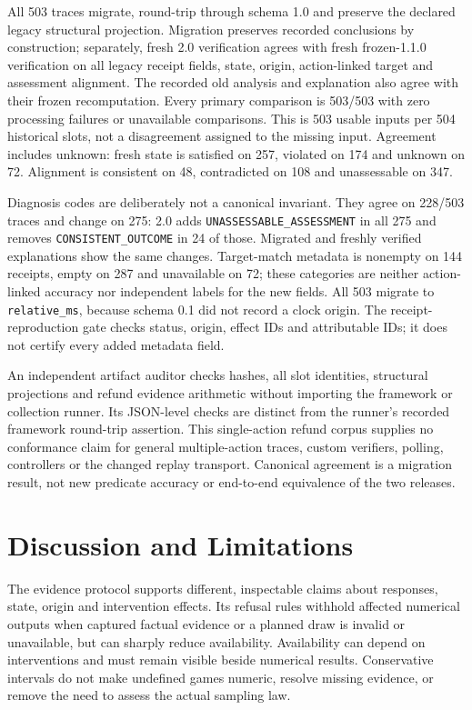 \documentclass[conference]{IEEEtran}
\begin{document}
All 503 traces migrate, round-trip through schema 1.0 and preserve the
declared legacy structural projection. Migration preserves recorded
conclusions by construction; separately, fresh 2.0 verification agrees with
fresh frozen-1.1.0 verification on all legacy receipt fields, state, origin,
action-linked target and assessment alignment. The recorded old analysis
and explanation also agree with their frozen recomputation. Every primary
comparison is 503/503 with zero processing failures or unavailable
comparisons. This is 503 usable inputs per 504 historical slots, not a
disagreement assigned to the missing input. Agreement includes unknown:
fresh state is satisfied on 257, violated on 174 and unknown on 72.
Alignment is consistent on 48, contradicted on 108 and unassessable on 347.

Diagnosis codes are deliberately not a canonical invariant. They agree on
228/503 traces and change on 275: 2.0 adds
\texttt{UNASSESSABLE\_ASSESSMENT} in all 275 and removes
\texttt{CONSISTENT\_OUTCOME} in 24 of those. Migrated and freshly verified
explanations show the same changes. Target-match metadata is nonempty on
144 receipts, empty on 287 and unavailable on 72; these categories are
neither action-linked accuracy nor independent labels for the new fields.
All 503 migrate to \texttt{relative\_ms}, because schema 0.1 did not record a
clock origin. The receipt-reproduction gate checks status, origin, effect
IDs and attributable IDs; it does not certify every added metadata field.

An independent artifact auditor checks hashes, all slot identities,
structural projections and refund evidence arithmetic without importing the
framework or collection runner. Its JSON-level checks are distinct from the
runner's recorded framework round-trip assertion. This single-action refund
corpus supplies no conformance claim for general multiple-action traces,
custom verifiers, polling, controllers or the changed replay transport.
Canonical agreement is a migration result, not new predicate accuracy or
end-to-end equivalence of the two releases.

\section{Discussion and Limitations}
The evidence protocol supports different, inspectable claims about responses,
state, origin and intervention effects. Its refusal rules withhold affected
numerical outputs when captured factual evidence or a planned draw is invalid
or unavailable, but can sharply reduce availability. Availability can depend
on interventions and must remain visible beside numerical results. Conservative
intervals do not make undefined games numeric, resolve missing evidence, or
remove the need to assess the actual sampling law.
\end{document}
